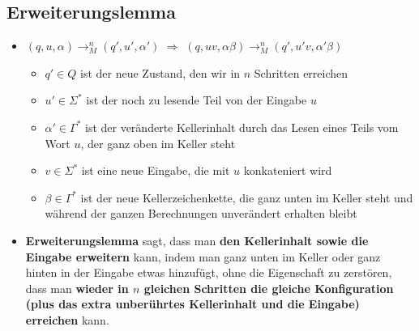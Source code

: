 \documentclass[ieeetran]{article}
\begin{document}
\subsection{Erweiterungslemma} %
\label{sub:erweiterungslemma}
\begin{itemize}
  \item $(q, u, \alpha) \rightarrow_M^n (q', u', \alpha')$ $\Longrightarrow$ $(q, uv, \alpha \beta) \rightarrow_M^n (q', u'v, \alpha' \beta)$
\begin{itemize}
    \item $q' \in Q$ ist der neue Zustand, den wir in $n$ Schritten erreichen
\item $u' \in \Sigma^*$ ist der noch zu lesende Teil von der Eingabe $u$
\item $\alpha' \in \Gamma^*$ ist der veränderte Kellerinhalt durch das Lesen eines Teils vom Wort $u$, der ganz oben im Keller steht
\item $v \in \Sigma^*$ ist eine neue Eingabe, die mit $u$ konkateniert wird
\item $\beta \in \Gamma^*$ ist der neue Kellerzeichenkette, die ganz unten im Keller steht und während der ganzen Berechnungen unverändert erhalten bleibt

\end{itemize}
\item \textbf{Erweiterungslemma} sagt, dass man \textbf{den Kellerinhalt sowie die Eingabe erweitern} kann, indem man ganz unten im Keller oder ganz hinten in der Eingabe etwas hinzufügt, ohne die Eigenschaft zu zerstören, dass man \textbf{wieder in $n$ gleichen Schritten die gleiche Konfiguration (plus das extra unberührtes Kellerinhalt und die Eingabe) erreichen} kann.

\end{itemize}
\end{document}
